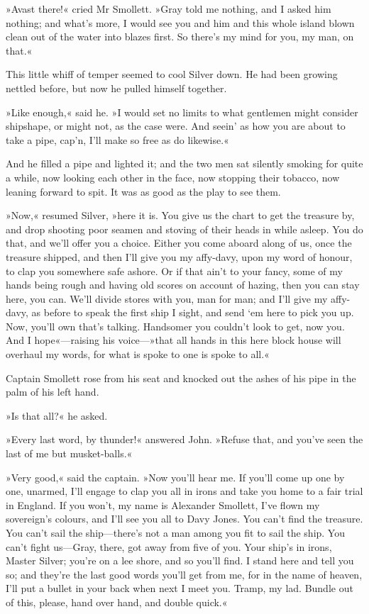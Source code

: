 »Avast there!« cried Mr Smollett. »Gray told me nothing, and I asked him nothing; and what's more, I would see you and him and this whole island blown clean out of the water into blazes first. So there's my mind for you, my man, on that.«

This little whiff of temper seemed to cool Silver down. He had been growing nettled before, but now he pulled himself together.

»Like enough,« said he. »I would set no limits to what gentlemen might consider shipshape, or might not, as the case were. And seein' as how you are about to take a pipe, cap'n, I'll make so free as do likewise.«

And he filled a pipe and lighted it; and the two men sat silently smoking for quite a while, now looking each other in the face, now stopping their tobacco, now leaning forward to spit. It was as good as the play to see them.

»Now,« resumed Silver, »here it is. You give us the chart to get the treasure by, and drop shooting poor seamen and stoving of their heads in while asleep. You do that, and we'll offer you a choice. Either you come aboard along of us, once the treasure shipped, and then I'll give you my affy-davy, upon my word of honour, to clap you somewhere safe ashore. Or if that ain't to your fancy, some of my hands being rough and having old scores on account of hazing, then you can stay here, you can. We'll divide stores with you, man for man; and I'll give my affy-davy, as before to speak the first ship I sight, and send `em here to pick you up. Now, you'll own that's talking. Handsomer you couldn't look to get, now you. And I hope«—raising his voice—»that all hands in this here block house will overhaul my words, for what is spoke to one is spoke to all.«

Captain Smollett rose from his seat and knocked out the ashes of his pipe in the palm of his left hand.

»Is that all?« he asked.

»Every last word, by thunder!« answered John. »Refuse that, and you've seen the last of me but musket-balls.«

»Very good,« said the captain. »Now you'll hear me. If you'll come up one by one, unarmed, I'll engage to clap you all in irons and take you home to a fair trial in England. If you won't, my name is Alexander Smollett, I've flown my sovereign's colours, and I'll see you all to Davy Jones. You can't find the treasure. You can't sail the ship—there's not a man among you fit to sail the ship. You can't fight us—Gray, there, got away from five of you. Your ship's in irons, Master Silver; you're on a lee shore, and so you'll find. I stand here and tell you so; and they're the last good words you'll get from me, for in the name of heaven, I'll put a bullet in your back when next I meet you. Tramp, my lad. Bundle out of this, please, hand over hand, and double quick.«

